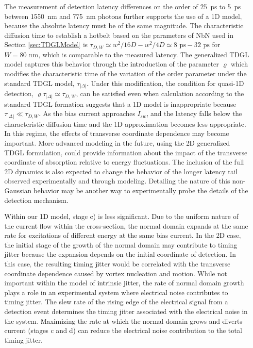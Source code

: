 \documentclass[%
reprint,
 amsmath,amssymb,
aps,
pra,
]{revtex4-1}
\begin{document}
\quad The measurement of detection latency differences on the order of 25~ps to 5~ps between 1550~nm and 775~nm photons further supports the use of a 1D model, because the absolute latency must be of the same magnitude.  The characteristic diffusion time to establish a hotbelt based on the parameters of NbN used in Section \ref{sec:TDGLModel} is \(\tau_{D,W} \simeq w^2/16D - w^2/4D  \simeq 8 \text{ ps} - 32 \text{ ps}\) for \(W=80 \text{ nm}\), which is comparable to the measured latency.  The generalized TDGL model captures this behavior through the introduction of the parameter \(\varrho\) which modifies the characteristic time of the variation of the order parameter under the standard TDGL model, \(\tau_{\left|\Delta\right|}\).  Under this modification, the condition for quasi-1D detection, \(\varrho \tau_{\left|\Delta\right|} \simeq \tau_{D,W}\), can be satisfied  even when calculation according to the standard TDGL formation suggests that a 1D model is inappropriate because \(\tau_{\left|\Delta\right|} \ll \tau_{D,W}\).  As the bias current approaches \(I_{sw}\), and the latency falls below the characteristic diffusion time and the 1D approximation becomes less appropriate.  In this regime, the effects of transverse coordinate dependence may become important.  More advanced modeling in the future, using the 2D generalized TDGL formulation, could provide information about the impact of the transverse coordinate of absorption relative to energy fluctuations.  The inclusion of the full 2D dynamics is also expected to change the behavior of the longer latency tail observed experimentally and through modeling.  Detailing the nature of this non-Gaussian behavior may be another way to experimentally probe the details of the detection mechanism.

\quad Within our 1D model, stage c) is less significant.  Due to the uniform nature of the current flow within the cross-section, the normal domain expands at the same rate for excitations of different energy at the same bias current.  In the 2D case, the initial stage of the growth of the normal domain may contribute to timing jitter because the expansion depends on the initial coordinate of detection.  In this case, the resulting timing jitter would be correlated with the transverse coordinate dependence caused by vortex nucleation and motion.  While not important within the model of intrinsic jitter, the rate of normal domain growth plays a role in an experimental system where electrical noise contributes to timing jitter.  The slew rate of the rising edge of the electrical signal from a detection event determines the timing jitter associated with the electrical noise in the system.  Maximizing the rate at which the normal domain grows and diverts current (stages c and d) can reduce the electrical noise contribution to the total timing jitter.
\end{document}
